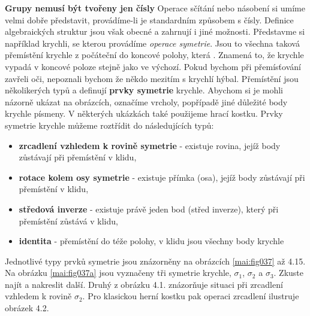 \begin{mdframed}[style=mdexam]
  \begin{example}\label{mai:exam051}
    \textbf{Grupy nemusí být tvořeny jen čísly}\newline
    Operace sčítání nebo násobení si umíme velmi dobře představit, provádíme-li je standardním
    způsobem s čísly. Definice algebraických struktur jsou však obecné a zahrnují i jiné možnosti.
    Představme si například krychli, se kterou provádíme \emph{operace symetrie}. Jsou to všechna
    taková přemístění krychle z počáteční do koncové polohy, která . Znamená to, že
    krychle vypadá v koncové poloze stejně jako ve výchozí. Pokud bychom při přemísťování zavřeli
    oči, nepoznali bychom že někdo mezitím s krychlí hýbal. Přemístění jsou několikerých typů a
    definují \textbf{prvky symetrie} krychle. Abychom si je mohli názorně ukázat na obrázcích,
    označíme vrcholy, popřípadě jiné důležité body krychle písmeny. V některých ukázkách také
    použijeme hrací kostku. Prvky symetrie krychle můžeme roztřídit do následujících typů:
    \begin{itemize}
      \item \textbf{zrcadlení vzhledem k rovině symetrie} - existuje rovina, jejíž body zůstávají
            při přemístění v klidu,
      \item \textbf{rotace kolem osy symetrie} - existuje přímka (osa), jejíž body zůstávají při
            přemístění v klidu,
      \item \textbf{středová inverze} - existuje právě jeden bod (střed inverze), který při
            přemístění zůstává v klidu,
      \item \textbf{identita} - přemístění do téže polohy, v klidu jsou všechny body krychle
    \end{itemize}
    Jednotlivé typy prvků symetrie jsou znázorněny na obrázcích \ref{mai:fig037} až 4.15. Na obrázku
    \ref{mai:fig037a} jsou vyznačeny tři symetrie krychle, \(\sigma_1\), \(\sigma_2\) a
    \(\sigma_3\). Zkuste najít a nakreslit další. Druhý z obrázku 4.1. znázorňuje situaci při
    zrcadlení vzhledem k rovině \(\sigma_2\). Pro klasickou herní kostku pak operaci zrcadlení
    ilustruje obrázek 4.2.
    
    {\centering
      \captionsetup{type=figure}
      \label{mai:fig037}
    \par}


\end{example}
\end{mdframed}
